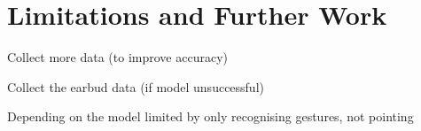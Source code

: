 \section{Limitations and Further Work} %
Collect more data (to improve accuracy)

Collect the earbud data (if model unsuccessful)



Depending on the model limited by only recognising gestures, not pointing

